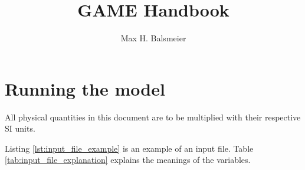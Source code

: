 \documentclass{article}
\title{GAME Handbook}
\author{Max H. Balsmeier}
\date{}
\begin{document}
\maketitle

\section{Running the model}
\label{sec:running_the_model}

All physical quantities in this document are to be multiplied with their respective SI units.

\label{lst:input_file_example}

Listing \ref{lst:input_file_example} is an example of an input file. Table \ref{tab:input_file_explanation} explains the meanings of the variables.
\end{document}
